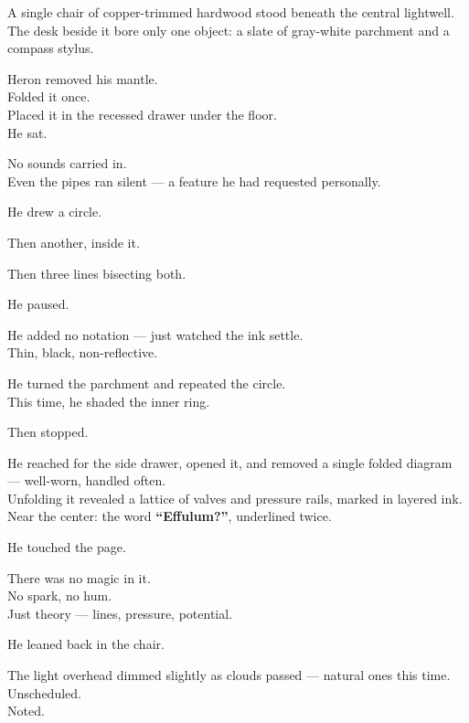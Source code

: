 \documentclass[12pt]{article}
\begin{document}
A single chair of copper-trimmed hardwood stood beneath the central lightwell.\\
The desk beside it bore only one object: a slate of gray-white parchment and a compass stylus.

\vspace{1em}

Heron removed his mantle.\\
Folded it once.\\
Placed it in the recessed drawer under the floor.\\
He sat.

No sounds carried in.\\
Even the pipes ran silent — a feature he had requested personally.

\vspace{1em}

He drew a circle.

Then another, inside it.

Then three lines bisecting both.

He paused.

He added no notation — just watched the ink settle.\\
Thin, black, non-reflective.

He turned the parchment and repeated the circle.\\
This time, he shaded the inner ring.

Then stopped.

\vspace{1em}

He reached for the side drawer, opened it, and removed a single folded diagram — well-worn, handled often.\\
Unfolding it revealed a lattice of valves and pressure rails, marked in layered ink.\\
Near the center: the word \textbf{“Effulum?”}, underlined twice.

He touched the page.

\vspace{1em}

There was no magic in it.\\
No spark, no hum.\\
Just theory — lines, pressure, potential.

\vspace{1em}

He leaned back in the chair.

The light overhead dimmed slightly as clouds passed — natural ones this time.\\
Unscheduled.\\
Noted.
\end{document}
